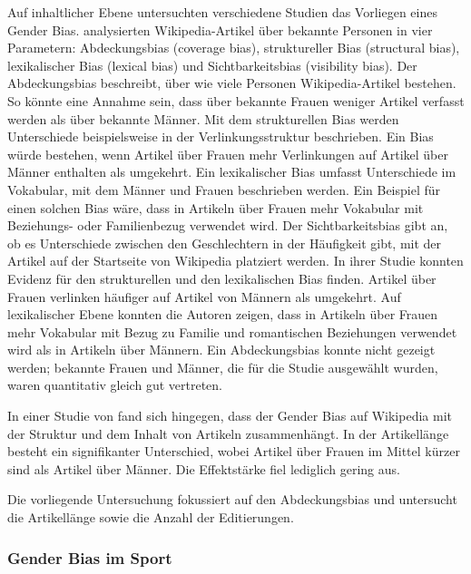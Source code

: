 \documentclass[11pt]{article}
\begin{document}
Auf inhaltlicher Ebene untersuchten verschiedene Studien das Vorliegen eines Gender Bias. \textcite{Wagner2015} analysierten Wikipedia-Artikel über bekannte Personen in vier Parametern: Abdeckungsbias (coverage bias), struktureller Bias (structural bias), lexikalischer Bias (lexical bias) und Sichtbarkeitsbias (visibility bias). Der Abdeckungsbias beschreibt, über wie viele Personen Wikipedia-Artikel bestehen. So könnte eine Annahme sein, dass über bekannte Frauen weniger Artikel verfasst werden als über bekannte Männer. Mit dem strukturellen Bias werden Unterschiede beispielsweise in der Verlinkungsstruktur beschrieben. Ein Bias würde bestehen, wenn Artikel über Frauen mehr Verlinkungen auf Artikel über Männer enthalten als umgekehrt. Ein lexikalischer Bias umfasst Unterschiede im Vokabular, mit dem Männer und Frauen beschrieben werden. Ein Beispiel für einen solchen Bias wäre, dass in Artikeln über Frauen mehr Vokabular mit Beziehungs- oder Familienbezug verwendet wird. Der Sichtbarkeitsbias gibt an, ob es Unterschiede zwischen den Geschlechtern in der Häufigkeit gibt, mit der Artikel auf der Startseite von Wikipedia platziert werden.
In ihrer Studie konnten \textcite{Wagner2015} Evidenz für den strukturellen und den lexikalischen Bias finden. Artikel über Frauen verlinken häufiger auf Artikel von Männern als umgekehrt. Auf lexikalischer Ebene konnten die Autoren zeigen, dass in Artikeln über Frauen mehr Vokabular mit Bezug zu Familie und romantischen Beziehungen verwendet wird als in Artikeln über Männern. Ein Abdeckungsbias konnte nicht gezeigt werden; bekannte Frauen und Männer, die für die Studie ausgewählt wurden, waren quantitativ gleich gut vertreten.

In einer Studie von  \textcite{GraellsGarrido2015} fand sich hingegen, dass der Gender Bias auf Wikipedia mit der Struktur und dem Inhalt von Artikeln zusammenhängt. In der Artikellänge besteht ein signifikanter Unterschied, wobei Artikel über Frauen im Mittel kürzer sind als Artikel über Männer. Die Effektstärke fiel lediglich gering aus.

Die vorliegende Untersuchung fokussiert auf den Abdeckungsbias und untersucht die Artikellänge sowie die Anzahl der Editierungen.

\subsubsection {Gender Bias im Sport}
\end{document}
